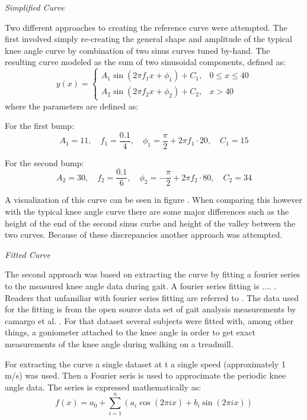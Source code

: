 \textit{Simplified Curve}

Two different approaches to creating the reference curve were attempted. The first involved simply re-creating the general shape and amplitude of the typical knee angle curve by combination of two sinus curves tuned by-hand. The resulting curve modeled as the sum of two sinusoidal components, defined as:
\[
y(x) =
\begin{cases}
A_1 \sin\left(2 \pi f_1 x + \phi_1\right) + C_1, & 0 \leq x \leq 40 \\
A_2 \sin\left(2 \pi f_2 x + \phi_2\right) + C_2, & x > 40
\end{cases}
\]
where the parameters are defined as:

For the first bump:
\[
A_1 = 11, \quad f_1 = \frac{0.1}{4}, \quad \phi_1 = \frac{\pi}{2} + 2\pi f_1 \cdot 20, \quad C_1 = 15
\]

For the second bump:
\[
A_2 = 30, \quad f_2 = \frac{0.1}{6}, \quad \phi_2 = -\frac{\pi}{2} + 2\pi f_2 \cdot 80, \quad C_2 = 34
\]

A visualization of this curve can be seen in figure . When comparing this however with the typical knee angle curve there are some major differences such as the height of the end of the second sinus curbe and height of the valley between the two curves. Because of these discrepancies another approach was attempted.
\newline

\textit{Fitted Curve}

The second approach was based on extracting the curve by fitting a fourier series to the measured knee angle data during gait. A fourier series fitting is .... . Readers that unfamiliar with fourier series fitting are referred to . The data used for the fitting is from the open source data set of gait analysis measurements by camargo et al. \cite{camargo_comprehensive_2021}. For that dataset several subjects were fitted with, among other things, a goniometer attached to the knee angle in order to get exact measurements of the knee angle during walking on a treadmill. 


For extracting the curve a single dataset at t a single speed (approximately 1 m/s) was used. Then a Fourier seris is used to approcimate the periodic knee angle data. The series is expressed mathematically as:
\begin{equation}
f(x) = a_0 + \sum_{i=1}^{n} \left( a_i \cos(2\pi i x) + b_i \sin(2\pi i x) \right)
\end{equation}

